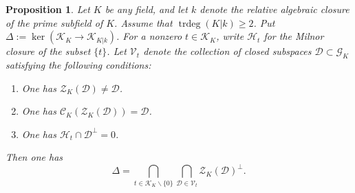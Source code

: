 \documentclass[12pt]{amsart}
\newcommand{\smin}{\smallsetminus}
\newcommand{\trdeg}{\operatorname{trdeg}}
\newcommand{\Vscr}{\mathscr{V}}
\newcommand{\Zcal}{\mathcal{Z}}
\newcommand{\Ccal}{\mathcal{C}}
\newcommand{\Gcal}{\mathcal{G}}
\newcommand{\Dcal}{\mathcal{D}}
\newcommand{\Hcal}{\mathcal{H}}
\newcommand{\Kcal}{\mathcal{K}}
\newtheorem{proposition}[theorem]{Proposition}
\theoremstyle{definition}
\begin{document}
\begin{proposition}\label{proposition:prime_subfield_characterization}
  Let $K$ be any field, and let $k$ denote the relative algebraic closure of the prime subfield of $K$.
  Assume that $\trdeg(K|k) \geq 2$.
  Put $\Delta := \ker(\Kcal_{K} \to \Kcal_{K|k})$.
  For a nonzero $t \in \Kcal_{K}$, write $\Hcal_{t}$ for the Milnor closure of the subset $\{t\}$.
  Let $\Vscr_{t}$ denote the collection of closed subspaces $\Dcal \subset \Gcal_{K}$ satisfying the following conditions:
  \begin{enumerate}
    \item One has $\Zcal_{K}(\Dcal) \neq \Dcal$.
    \item One has $\Ccal_{K}(\Zcal_{K}(\Dcal)) = \Dcal$.
    \item One has $\Hcal_{t} \cap \Dcal^{\perp} = 0$.
  \end{enumerate}
  Then one has
  \[ \Delta = \bigcap_{t \in \Kcal_{K} \smin \{0\}} \bigcap_{\Dcal \in \Vscr_{t}} \Zcal_{K}(\Dcal)^{\perp}. \]
\end{proposition}
\end{document}
